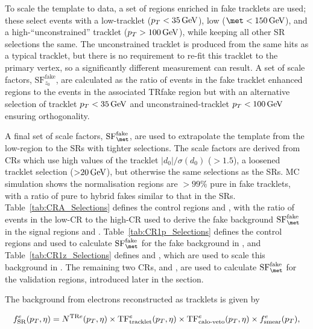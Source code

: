 To scale the template to data, a set of regions enriched in fake tracklets are used; these select events with a low-\pt tracklet ($p_T< 35\,\text{GeV}$), low \met ($\met< 150\,\GeV$), and a high-\pt \enquote{unconstrained} tracklet ($p_T> 100\,\text{GeV}$), while keeping all other SR selections the same. The unconstrained tracklet is produced from the same hits as a typical tracklet, but there is no requirement to re-fit this tracklet to the primary vertex, so a significantly different \pt measurement can result. A set of scale factors, $\mathrm{SF}_{z_0}^{\mathrm{fake}}$, are calculated as the ratio of events in the fake tracklet enhanced regions to the events in the associated TRfake region but with an alternative selection of tracklet $p_T < 35\,\text{GeV}$ and unconstrained-tracklet $p_T <100\,\text{GeV}$ ensuring orthogonality.

A final set of scale factors, $\mathrm{SF}_{\met}^{\mathrm{fake}}$, are used to extrapolate the template from the low-\met region to the SRs with tighter \met selections. The scale factors are derived from CRs which use high values of the tracklet $|d_{0}|/\sigma(d_{0})$ (${>}1.5$), a loosened tracklet \pt selection (${>}20\,\text{GeV}$), but otherwise the same selections as the SRs. MC simulation shows the normalisation regions are ${>}99$\% pure in fake tracklets, with a ratio of pure to hybrid fakes similar to that in the SRs. Table~\ref{tab:CRA_Selections} defines the control regions \CRAl and \CRAh, with the ratio of events in the low-CR to the high-CR used to derive the fake background $\mathrm{SF}_{\met}^{\mathrm{fake}}$ in the signal regions \SRAh and \SRAm. Table~\ref{tab:CR1p_Selections} defines the control regions \CRBol and \CRBoh used to calculate $\mathrm{SF}_{\met}^{\mathrm{fake}}$ for the fake background in \SRBo, and Table~\ref{tab:CR1z_Selections} defines \CRBzl and \CRBzh, which are used to scale this background in \SRBz. The remaining two CRs, \CRBom and \CRBzm, are used to calculate $\mathrm{SF}_{\met}^{\mathrm{fake}}$ for the validation regions, introduced later in the section. 

The background from electrons reconstructed as tracklets is given by

\begin{equation*}
f_{\mathrm{SR}}^{e}(p_T,\eta) = N^{\mathrm{TR}e}(p_T,\eta) \times \mathrm{TF}^e_{\mathrm{tracklet}}(p_T,\eta) \times \mathrm{TF}^e_{\textrm{calo-veto}}(p_T,\eta) \times f^{e}_{\mathrm{smear}}(p_T),
\end{equation*}

